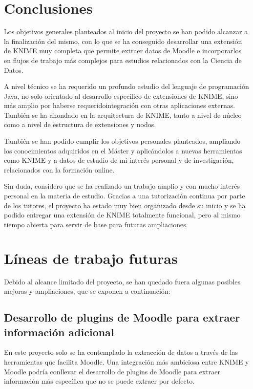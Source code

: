 

\section{Conclusiones}

Los objetivos generales planteados al inicio del proyecto se han podido alcanzar a la finalización del mismo, con 
lo que se ha conseguido desarrollar una extensión de KNIME muy completa que permite extraer datos de Moodle e
 incorporarlos en flujos de trabajo más complejos para estudios relacionados con la Ciencia de Datos. 
\ 

A nivel técnico se ha requerido un profundo estudio del lenguaje de programación Java, no solo orientado al desarrollo
específico de extensiones de KNIME, sino más amplio por haberse requeridointegración con otras aplicaciones externas. 
También se ha ahondado en la arquitectura de KNIME, tanto a nivel de núcleo como a nivel de estructura de extensiones y nodos. 

También se han podido cumplir los objetivos personales planteados, ampliando los conocimientos adquiridos en el Máster y 
aplicándolos a nuevas herramientas como KNIME y a datos de estudio de mi interés personal y de investigación, relacionados 
con la formación online. 

Sin duda, considero que se ha realizado un trabajo amplio y con mucho interés personal en la materia de estudio. 
Gracias a una tutorización continua por parte de los tutores, el proyecto ha estado muy bien organizado desde 
su inicio y se ha podido entregar una extensión de KNIME totalmente funcional, pero al mismo tiempo abierta para servir 
de base para futuras ampliaciones. 


\section{Líneas de trabajo futuras}

Debido al alcance limitado del proyecto, se han quedado fuera algunas posibles mejoras y ampliaciones, que se exponen a continuación: 

\subsection{Desarrollo de plugins de Moodle para extraer información adicional}

En este proyecto solo se ha contemplado la extracción de datos a través de las herramientas que facilita Moodle. 
Una integración más ambiciosa entre KNIME y Moodle podría conllevar el desarrollo de plugins de Moodle para extraer información más específica que no se puede extraer por defecto. 

